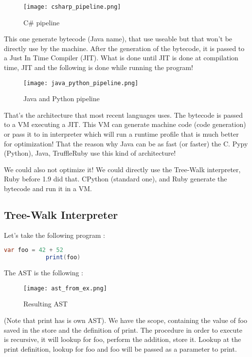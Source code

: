     \begin{figure}[H]
         \centering
         \texttt{[image: csharp\_pipeline.png]}
         \caption{C\# pipeline}
         \label{fig:csharp_pipe}
    \end{figure}
    This one generate bytecode (Java name), that use useable but that
    won't be directly use by the machine. After the generation of the bytecode,
    it is passed to a Just In Time Compiler (JIT). What is done until JIT is
    done at compilation time, JIT and the following is done while running the program! 
    \begin{figure}[H]
         \centering
         \texttt{[image: java\_python\_pipeline.png]}
         \caption{Java and Python pipeline}
         \label{fig:java_pipel}
    \end{figure}
    That's the architecture that most recent languages uses. The bytecode is
    passed to a VM executing a JIT. This VM can generate machine code (code
    generation) or pass it to in interpreter which will run a runtime profile
    that is much better for optimization! That the reason why Java can be as
    fast (or faster) the C. Pypy (Python), Java, TruffleRuby use this kind of
    architecture!

    We could also not optimize it! We could directly use the Tree-Walk
    interpreter, Ruby before 1.9 did that. CPython (standard one), and Ruby
    generate the bytecode and run it in a VM.

    \subsection{Tree-Walk Interpreter}
        Let's take the following program : 
        \begin{lstlisting}[language=Java]
            var foo = 42 + 52
            print(foo)
        \end{lstlisting}
        The AST is the following : 
        \begin{figure}[H]
             \centering
             \texttt{[image: ast\_from\_ex.png]}
             \caption{Resulting AST}
             \label{fig:ast_from_ex}
        \end{figure}
        (Note that print has is own AST). We have the scope, containing the
        value of foo saved in the store and the definition of print. The
        procedure in order to execute is recursive, it will lookup for foo,
        perform the addition, store it. Lookup at the print definition, lookup
        for foo and foo will be passed as a parameter to print.
